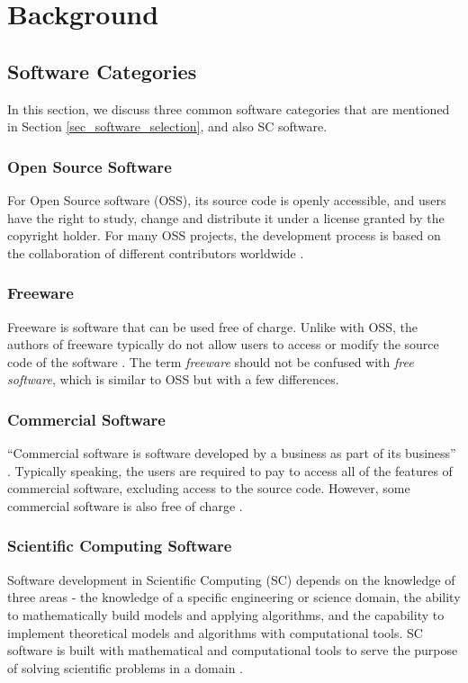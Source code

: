 \chapter{Background}
\label{ch_background}

\section{Software Categories}
In this section, we discuss three common software categories that are mentioned in Section \ref{sec_software_selection}, and also SC software. 

\subsection{Open Source Software}
\label{sec_open_source_software}
For Open Source software (OSS), its source code is openly accessible, and users have the right to study, change and distribute it under a license granted by the copyright holder. For many OSS projects, the development process is based on the collaboration of different contributors worldwide \cite{Corbly2014}. 

\subsection{Freeware}
\label{sec_freeware}
Freeware is software that can be used free of charge. Unlike with OSS, the authors of freeware typically do not allow users to access or modify the source code of the software \cite{LINFO2006}. The term \textit{freeware} should not be confused with \textit{free software}, which is similar to OSS but with a few differences.

\subsection{Commercial Software}
``Commercial software is software developed by a business as part of its business'' \cite{GNU2019}.
Typically speaking, the users are required to pay to access all of the features of commercial software, excluding access to the source code. However, some commercial software is also free of charge \cite{GNU2019}.

\subsection{Scientific Computing Software}
Software development in Scientific Computing (SC) depends on the knowledge of three areas - the knowledge of a specific engineering or science domain, the ability to mathematically build models and applying algorithms, and the capability to implement theoretical models and algorithms with computational tools. SC software is built with mathematical and computational tools to serve the purpose of solving scientific problems in a domain \cite{Mehta2015}.


